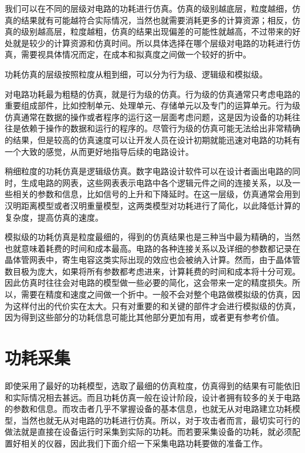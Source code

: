 我们可以在不同的层级对电路的功耗进行仿真。仿真的级别越底层，粒度越细，仿真的结果就有可能越符合实际情况，当然也就需要消耗更多的计算资源；相反，仿真的级别越高层，粒度越粗，仿真的结果出现偏差的可能性就越高，不过带来的好处就是较少的计算资源和仿真时间。所以具体选择在哪个层级对电路的功耗进行仿真，需要视具体情况而定，在成本和拟真度之间做一个较好的折中。

功耗仿真的层级按照粒度从粗到细，可以分为行为级、逻辑级和模拟级。

对电路功耗最为粗糙的仿真，就是行为级的仿真。行为级的仿真通常只考虑电路的重要组成部件，比如控制单元、处理单元、存储单元以及专门的运算单元。行为级仿真通常在数据的操作或者程序的运行这一层面考虑问题，这是因为设备的功耗往往是依赖于操作的数据和运行的程序的。尽管行为级的仿真可能无法给出非常精确的结果，但是较高的仿真速度可以让开发人员在设计初期就能迅速对电路的功耗有一个大致的感觉，从而更好地指导后续的电路设计。

稍细粒度的功耗仿真是逻辑级仿真。数字电路设计软件可以在设计者画出电路的同时，生成电路的网表，这些网表表示电路中各个逻辑元件之间的连接关系，以及一些相关的参数和信息，比如信号的上升和下降延时。在这一层级，仿真通常会用到汉明距离模型或者汉明重量模型，这两类模型对功耗进行了简化，以此降低计算的复杂度，提高仿真的速度。

模拟级的功耗仿真是粒度最细的，得到的仿真结果也是三种当中最为精确的，当然也就意味着耗费的时间和成本最高。电路的各种连接关系以及详细的参数都记录在晶体管网表中，寄生电容这类实际出现的效应也会被纳入计算。然而，由于晶体管数目极为庞大，如果将所有参数都考虑进来，计算耗费的时间和成本将十分可观。因此仿真时往往会对电路的模型做一些必要的简化，这会带来一定的精度损失。所以，需要在精度和速度之间做一个折中。一般不会对整个电路做模拟级的仿真，因为这样付出的代价实在太大。只有对重要的和关键的部件才会进行模拟级的仿真，因为得到这些部分的功耗信息可能比其他部分更加有用，或者更有参考价值。

\section{功耗采集} %
\label{sec:collect}
即使采用了最好的功耗模型，选取了最细的仿真粒度，仿真得到的结果有可能依旧和实际情况相去甚远。而且功耗仿真一般在设计阶段，设计者拥有较多的关于电路的参数和信息。而攻击者几乎不掌握设备的基本信息，也就无从对电路建立功耗模型，当然也就无从对电路的功耗进行仿真。所以，对于攻击者而言，最切实可行的做法就是直接在设备运行时采集到实际的功耗。而若要采集设备的功耗，就必须配置好相关的仪器，因此我们下面介绍一下采集电路功耗要做的准备工作。

\vspace*{\baselineskip}

